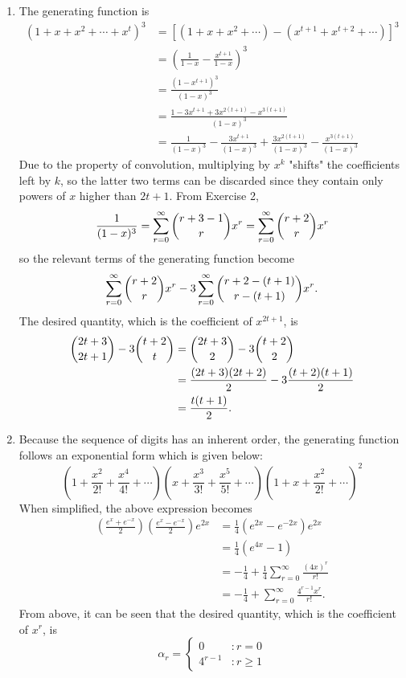 \documentclass[a4paper, 12pt]{article}
\begin{document}
\begin{enumerate}
		\item The generating function is
		\begin{align*}
		(1 + x + x^2 + \cdots + x^t)^3 &= [(1 + x + x^2 + \cdots) - (x^{t + 1} + x^{t + 2} + \cdots)]^3 \\
		&= \left( \frac{1}{1 - x} - \frac{x^{t + 1}}{1 - x} \right)^3 \\
		&= \frac{(1 - x^{t + 1})^3}{(1 - x)^3} \\
		&= \frac{1 - 3x^{t + 1} + 3x^{2(t + 1)} - x^{3(t + 1)}}{(1 - x)^3} \\
		&= \frac{1}{(1 - x)^3} - \frac{3x^{t + 1}}{(1 - x)^3} + \frac{3x^{2(t + 1)}}{(1 - x)^3} - \frac{x^{3(t + 1)}}{(1 - x)^3}
		\end{align*}
		Due to the property of convolution, multiplying by $x^k$ "shifts" the coefficients left by $k$, so the latter two terms can be discarded since they contain only powers of $x$ higher than $2t + 1$. From Exercise 2,
		\[ \frac{1}{(1 - x)^3} = \sum_{r = 0}^{\infty}{\dbinom{r + 3 - 1}{r}}x^r = \sum_{r = 0}^{\infty}{\dbinom{r + 2}{r}}x^r \]
		so the relevant terms of the generating function become
		\[ \sum_{r = 0}^{\infty}{\dbinom{r + 2}{r}}x^r - 3\sum_{r = 0}^{\infty}{\dbinom{r + 2 - (t + 1)}{r - (t + 1)}}x^r. \]
		The desired quantity, which is the coefficient of $x^{2t + 1}$, is
		\begin{align*}
		\dbinom{2t + 3}{2t + 1} - 3\dbinom{t + 2}{t} &= \dbinom{2t + 3}{2} - 3\dbinom{t + 2}{2} \\
		&= \frac{(2t + 3)(2t + 2)}{2} - 3\frac{(t + 2)(t + 1)}{2} \\
		&= \frac{t(t + 1)}{2}.
		\end{align*}
		
		\item Because the sequence of digits has an inherent order, the generating function follows an exponential form which is given below:
		\[ \left( 1 + \frac{x^2}{2!} + \frac{x^4}{4!} + \cdots \right) \left( x + \frac{x^3}{3!} + \frac{x^5}{5!} + \cdots \right) \left( 1 + x + \frac{x^2}{2!} + \cdots \right)^2 \]
		When simplified, the above expression becomes
		\begin{align*}
		\left( \frac{e^x + e^{-x}}{2} \right) \left( \frac{e^x - e^{-x}}{2} \right)e^{2x} &= \frac{1}{4}(e^{2x} - e^{-2x})e^{2x} \\
		&= \frac{1}{4}(e^{4x} - 1) \\
		&= -\frac{1}{4} + \frac{1}{4}\sum_{r = 0}^{\infty}\frac{(4x)^r}{r!} \\
		&= -\frac{1}{4} + \sum_{r = 0}^{\infty}\frac{4^{r - 1}x^r}{r!}.
		\end{align*}
		From above, it can be seen that the desired quantity, which is the coefficient of $x^r$, is
		\[ \alpha_r = \left\{
			\begin{array}{lr}
				0 &: r = 0 \\
				4^{r - 1} &: r \geq 1
			\end{array}
		\right. \] 
		

\end{enumerate}
\end{document}
